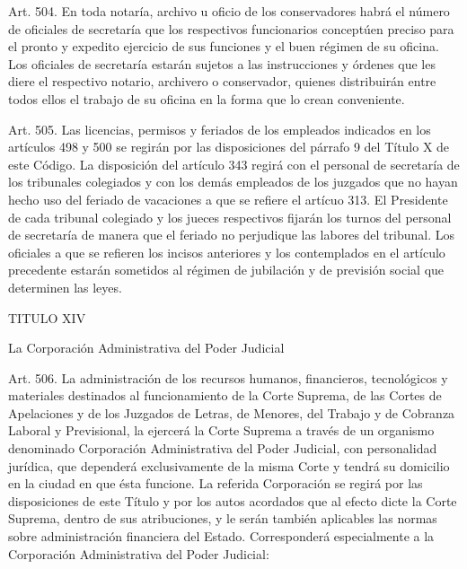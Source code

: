     Art. 504. En toda notaría, archivo u oficio de los conservadores habrá el número de oficiales de secretaría que los respectivos funcionarios conceptúen preciso para el pronto y expedito ejercicio de sus funciones y el buen régimen de su oficina.
    Los oficiales de secretaría estarán sujetos a las instrucciones y órdenes que les diere el respectivo notario, archivero o conservador, quienes distribuirán entre todos ellos el trabajo de su oficina en la forma que lo crean conveniente.


    Art. 505. Las licencias, permisos y feriados de los empleados indicados en los artículos 498 y 500 se regirán por las disposiciones del párrafo 9 del Título X de este Código.
    La disposición del artículo 343 regirá con el personal de secretaría de los tribunales colegiados y con los demás empleados de los juzgados que no hayan hecho uso del feriado de vacaciones a que se refiere el artícuo 313.
    El Presidente de cada tribunal colegiado y los jueces respectivos fijarán los turnos del personal de secretaría de manera que el feriado no perjudique las labores del tribunal.
    Los oficiales a que se refieren los incisos anteriores y los contemplados en el artículo precedente estarán sometidos al régimen de jubilación y de previsión social que determinen las leyes.



    TITULO XIV

    La Corporación Administrativa del Poder Judicial



    Art. 506. La administración de los recursos humanos, financieros, tecnológicos y materiales destinados al funcionamiento de la Corte Suprema, de las Cortes de Apelaciones y de los Juzgados de Letras, de Menores, del Trabajo y de Cobranza Laboral y Previsional, la ejercerá la Corte Suprema a través de un organismo denominado Corporación Administrativa del Poder Judicial, con personalidad jurídica, que dependerá exclusivamente de la misma Corte y tendrá su domicilio en la ciudad en que ésta funcione.
    La referida Corporación se regirá por las disposiciones de este Título y por los autos acordados que al efecto dicte la Corte Suprema, dentro de sus atribuciones, y le serán también aplicables las normas sobre administración financiera del Estado.
    Corresponderá especialmente a la Corporación Administrativa del Poder Judicial:

